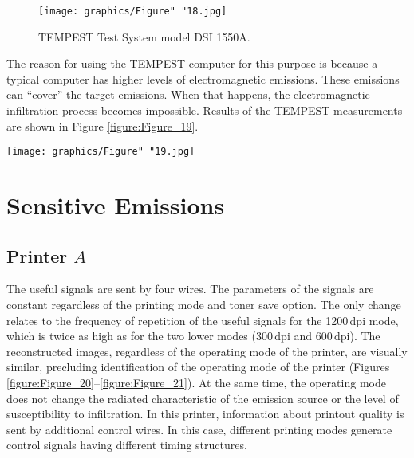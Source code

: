 \documentclass[letterpaper,journal]{ieeetran}
\begin{document}
\begin{figure}[ht]
    \centering
    \texttt{[image: graphics/Figure" "18.jpg]}
    \caption{TEMPEST Test System model DSI 1550A.}
    \label{figure:Figure_18}
\end{figure}

The reason for using the TEMPEST computer for this purpose is because a
typical computer has higher levels of electromagnetic emissions. These
emissions can ``cover'' the target
emissions. When that happens, the electromagnetic infiltration process
becomes impossible. Results of the TEMPEST measurements are shown in Figure
\ref{figure:Figure_19}.

\begin{figure*}[ht]
    \centering
    \texttt{[image: graphics/Figure" "19.jpg]}
    \caption{Radiated disturbances measured from the $A$ and $B$ printers,
        both operating in 600\,dpi mode (with Eco option); bandwidth =
        \SI{1}{\mega\hertz}.}
    \label{figure:Figure_19}
\end{figure*}

\section{Sensitive Emissions}

\subsection{Printer $A$}

The useful signals are sent by four wires. The parameters of the signals are
constant regardless of the printing mode and toner save option. The only
change relates to the frequency of repetition of the useful signals for the
1200\,dpi mode, which is twice as high as for the two lower modes (300\,dpi
and 600\,dpi). The reconstructed images, regardless of the operating mode of
the printer, are visually similar, precluding identification of the operating
mode of the printer (Figures \ref{figure:Figure_20}--\ref{figure:Figure_21}).
At the same time, the operating mode does not change the radiated
characteristic of the emission source or the level of susceptibility to
infiltration. In this printer, information about printout quality is sent by
additional control wires. In this case, different printing modes generate
control signals having different timing structures.
\end{document}
